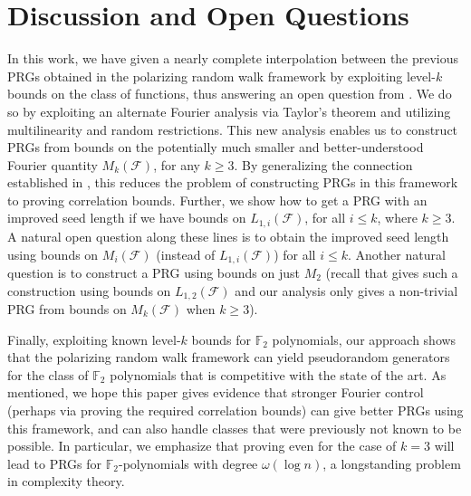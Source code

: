 \documentclass[10pt,a4paper]{article}
\theoremstyle{definition}
\begin{document}
\section{Discussion and Open Questions}
In this work, we have given a nearly complete interpolation between the previous PRGs obtained in the polarizing random walk framework by exploiting level-$k$ bounds on the class of functions, thus answering an open question from \cite{CHLT}. We do so by exploiting an alternate Fourier analysis via Taylor's theorem and utilizing multilinearity and random restrictions. This new analysis enables us to  construct PRGs from bounds on the potentially much smaller and better-understood Fourier quantity $M_k(\mathcal{F})$, for any $k \ge 3$. By generalizing the connection established in \cite{xorlemma}, this reduces the problem of constructing PRGs in this framework to proving correlation bounds. Further, we show how to get a PRG with an improved seed length if we have bounds on $L_{1,i}(\mathcal{F})$, for all $i \le k$, where $k\ge 3$. A natural open question along these lines is to obtain the improved seed length using bounds on $M_i(\mathcal{F})$ (instead of $L_{1,i}(\mathcal{F})$) for all $i \le k$. Another natural question is to construct a PRG using bounds on just $M_2$ (recall that \cite{CHLT} gives such a construction using bounds on $L_{1,2}(\mathcal{F})$ and our analysis only gives a non-trivial PRG from bounds on $M_k(\mathcal{F})$ when $k \ge 3$).

Finally, exploiting known level-$k$ bounds for $\mathbb{F}_2$ polynomials, our approach shows that the polarizing random walk framework can yield  pseudorandom generators for the class of $\mathbb{F}_2$ polynomials that is competitive with the state of the art.  As mentioned, we hope this paper gives evidence that stronger Fourier control (perhaps via proving the required correlation bounds) can give better PRGs using this framework, and can also handle classes that were previously not known to be possible.  In particular, we emphasize that proving  even for the case of $k=3$ will lead to PRGs for $\mathbb{F}_2$-polynomials with degree $\omega(\log n)$, a longstanding problem in complexity theory. 
\end{document}
